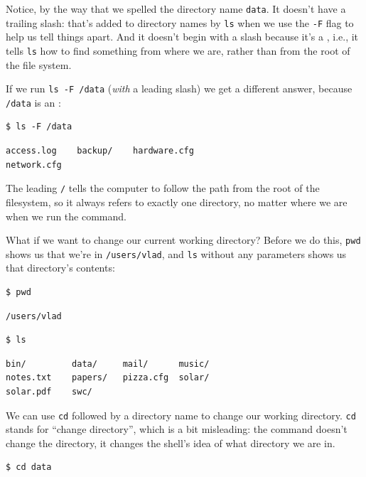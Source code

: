 \documentclass{book}
\begin{document}
Notice, by the way that we spelled the directory name \texttt{data}. It
doesn't have a trailing slash: that's added to directory names by
\texttt{ls} when we use the \texttt{-F} flag to help us tell things
apart. And it doesn't begin with a slash because it's a
, i.e., it tells \texttt{ls}
how to find something from where we are, rather than from the root of
the file system.

If we run \texttt{ls -F /data} (\emph{with} a leading slash) we get a
different answer, because \texttt{/data} is an
:

\begin{verbatim}
$ ls -F /data
\end{verbatim}

\begin{verbatim}
access.log    backup/    hardware.cfg
network.cfg
\end{verbatim}

The leading \texttt{/} tells the computer to follow the path from the
root of the filesystem, so it always refers to exactly one directory, no
matter where we are when we run the command.

What if we want to change our current working directory? Before we do
this, \texttt{pwd} shows us that we're in \texttt{/users/vlad}, and
\texttt{ls} without any parameters shows us that directory's contents:

\begin{verbatim}
$ pwd
\end{verbatim}

\begin{verbatim}
/users/vlad
\end{verbatim}

\begin{verbatim}
$ ls
\end{verbatim}

\begin{verbatim}
bin/         data/     mail/      music/
notes.txt    papers/   pizza.cfg  solar/
solar.pdf    swc/
\end{verbatim}

We can use \texttt{cd} followed by a directory name to change our
working directory. \texttt{cd} stands for ``change directory'', which is
a bit misleading: the command doesn't change the directory, it changes
the shell's idea of what directory we are in.

\begin{verbatim}
$ cd data
\end{verbatim}
\end{document}
